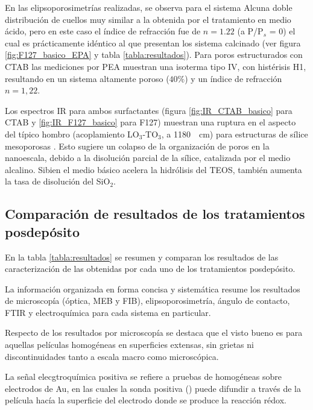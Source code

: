 		 En las elipsoporosimetrías realizadas, se observa para el sistema Alc\pdmF\space una doble distribución de cuellos muy similar a la obtenida por el tratamiento en medio ácido, pero en este caso el índice de refracción fue de $n=1.22$ (a P/P$_s$ = 0) el cual es prácticamente idéntico al que presentan los sistema calcinado (ver figura \ref{fig:F127_basico_EPA} y tabla \ref{tabla:resultados}). Para poros estructurados con CTAB las mediciones por PEA muestran una isoterma tipo IV, con histérisis H1, resultando en un sistema altamente poroso ($40\%$) y un índice de refracción $n=1,22$.
	
		 Los espectros IR para ambos surfactantes (figura \ref{fig:IR_CTAB_basico} para CTAB y \ref{fig:IR_F127_basico} para F127) muestran una ruptura en el aspecto del típico hombro (acoplamiento LO$_3$-TO$_3$, a \SI{1180}{\per\cm}) para estructuras de sílice mesoporosas \cite{Olsen1989,Innocenzi2003,Angelome2008}. Esto sugiere un colapso de la organización de poros en la nanoescala, debido a la disolución parcial de la sílice, catalizada por el medio alcalino. Si\space bien el medio básico acelera la hidrólisis del TEOS, también aumenta la tasa de disolución del SiO$_2$.\cite{Mazer1994,Niibori2000,Gorrepati2010}

	 \subsection{Comparación de resultados de los tratamientos posdepósito}
	 		
	 		En la tabla \ref{tabla:resultados} se resumen y comparan los resultados de las caracterización de las \pdm\space obtenidas por cada uno de los tratamientos posdepósito. 

	 		La información organizada en forma concisa y sistemática resume los resultados de microscopía (óptica, MEB y FIB), elipsoporosimetría, ángulo de contacto, FTIR y electroquímica para cada sistema en particular. 

	 		Respecto de los resultados por microscopía se destaca que el visto bueno es para aquellas películas homogéneas en superficies extensas, sin grietas ni discontinuidades tanto a escala macro como microscópica. 

	 		La señal elecgtroquímica positiva se refiere a pruebas de \pdm\space homogéneas sobre electrodos de Au, en las cuales la sonda positiva (\aminorutenio) puede difundir a través de la película hacía la superficie del electrodo donde se produce la reacción rédox.


